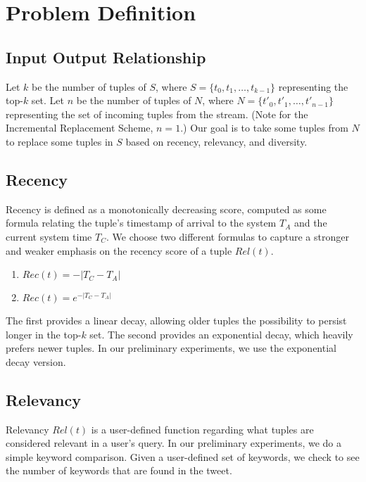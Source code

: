 \section{Problem Definition}
\subsection{Input Output Relationship}
	Let $k$ be the number of tuples of $S$, where $S = \{t_0, t_1, \dots, t_{k-1}\}$ representing the top-$k$ set.  Let $n$ be the number of tuples of $N$, where $N = \{t'_0, t'_1, \dots, t'_{n-1}\}$ representing the set of incoming tuples from the stream.  (Note for the Incremental Replacement Scheme, $n = 1$.)  Our goal is to take some tuples from $N$ to replace some tuples in $S$ based on recency, relevancy, and diversity.

\subsection{Recency}
	Recency is defined as a monotonically decreasing score, computed as some formula relating the tuple's timestamp of arrival to the system $T_A$ and the current system time $T_C$.  We choose two different formulas to capture a stronger and weaker emphasis on the recency score of a tuple $Rel(t)$.
	\begin{enumerate}
		\item $Rec(t) = -|T_C - T_A|$
		\item $Rec(t) = e^{-|T_C - T_A|}$
	\end{enumerate}
	The first provides a linear decay, allowing older tuples the possibility to persist longer in the top-$k$ set.  The second provides an exponential decay, which heavily prefers newer tuples.
	In our preliminary experiments, we use the exponential decay version.
	

\subsection{Relevancy}
	Relevancy $Rel(t)$ is a user-defined function regarding what tuples are considered relevant in a user's query.  %
	In our preliminary experiments, we do a simple keyword comparison.  Given a user-defined set of keywords, we check to see the number of keywords that are found in the tweet.


